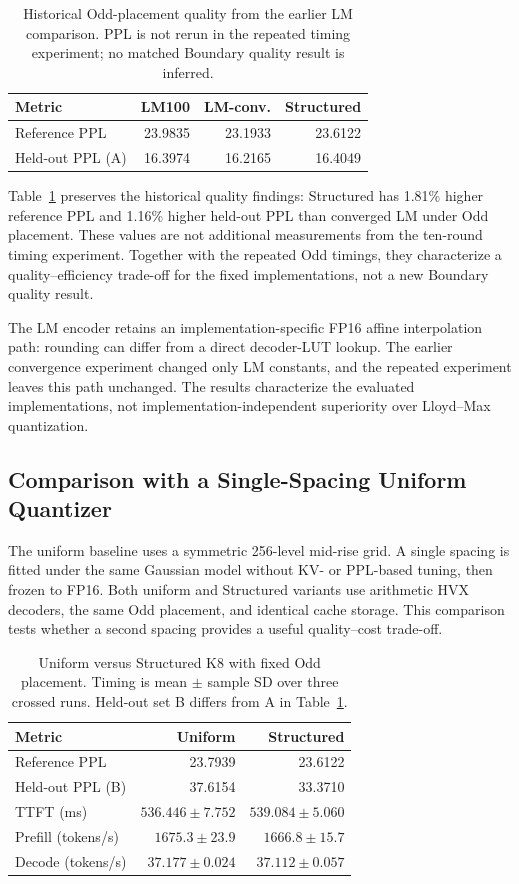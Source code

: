 \documentclass[conference,a4paper,10pt]{IEEEtran}
\begin{document}
\begin{table}[t]
\caption{Historical Odd-placement quality from the earlier LM comparison. PPL is not rerun in the repeated timing experiment; no matched Boundary quality result is inferred.}
\label{tab:lm}
\centering
\setlength{\tabcolsep}{3.5pt}
\begin{tabular}{@{}lrrr@{}}
\toprule
Metric & LM100 & LM-conv. & Structured\\
\midrule
Reference PPL & 23.9835 & 23.1933 & 23.6122\\
Held-out PPL (A) & 16.3974 & 16.2165 & 16.4049\\
\bottomrule
\end{tabular}
\end{table}

Table~\ref{tab:lm} preserves the historical quality findings: Structured has 1.81\% higher reference PPL and 1.16\% higher held-out PPL than converged LM under Odd placement. These values are not additional measurements from the ten-round timing experiment. Together with the repeated Odd timings, they characterize a quality--efficiency trade-off for the fixed implementations, not a new Boundary quality result.

The LM encoder retains an implementation-specific FP16 affine interpolation path: rounding can differ from a direct decoder-LUT lookup. The earlier convergence experiment changed only LM constants, and the repeated experiment leaves this path unchanged. The results characterize the evaluated implementations, not implementation-independent superiority over Lloyd--Max quantization.

\subsection{Comparison with a Single-Spacing Uniform Quantizer}
The uniform baseline uses a symmetric 256-level mid-rise grid. A single spacing is fitted under the same Gaussian model without KV- or PPL-based tuning, then frozen to FP16. Both uniform and Structured variants use arithmetic HVX decoders, the same Odd placement, and identical cache storage. This comparison tests whether a second spacing provides a useful quality--cost trade-off.

\begin{table}[t]
\caption{Uniform versus Structured K8 with fixed Odd placement. Timing is mean $\pm$ sample SD over three crossed runs. Held-out set B differs from A in Table~\ref{tab:lm}.}
\label{tab:uniform}
\centering
\setlength{\tabcolsep}{4pt}
\begin{tabular}{@{}lrr@{}}
\toprule
Metric & Uniform & Structured\\
\midrule
Reference PPL & 23.7939 & 23.6122\\
Held-out PPL (B) & 37.6154 & 33.3710\\
TTFT (ms) & $536.446\pm7.752$ & $539.084\pm5.060$\\
Prefill (tokens/s) & $1675.3\pm23.9$ & $1666.8\pm15.7$\\
Decode (tokens/s) & $37.177\pm0.024$ & $37.112\pm0.057$\\
\bottomrule
\end{tabular}
\end{table}
\end{document}
